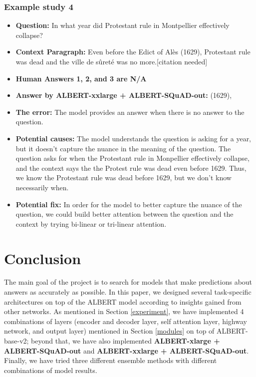 \documentclass{article}
\begin{document}
\subsubsection{Example study 4}
\begin{itemize}
    \item \textbf{Question:} In what year did Protestant rule in Montpellier effectively collapse?
    \item \textbf{Context Paragraph:} Even before the Edict of Alès (1629), Protestant rule was dead and the ville de sûreté was no more.[citation needed]
    \item \textbf{Human Answers 1, 2, and 3 are N/A} 
    \item \textbf{Answer by ALBERT-xxlarge + ALBERT-SQuAD-out:} (1629),
\item \textbf{The error:} The model provides an answer when there is no answer to the question.
    \item \textbf{Potential causes:} The model understands the question is asking for a year, but it doesn't capture the nuance in the meaning of the question. The question asks for when the Protestant rule in Monpellier effectively collapse, and the context says the the Protest rule was dead even before 1629. Thus, we know the Protestant rule was dead before 1629, but we don't know necessarily when.
    \item \textbf{Potential fix:} In order for the model to better capture the nuance of the question, we could build better attention between the question and the context by trying bi-linear or tri-linear attention.
\end{itemize}


\section{Conclusion} \label{conclusion}
The main goal of the project is to search for models that make predictions about answers as accurately as possible. In this paper, we designed several task-specific architectures on top of the ALBERT model according to insights gained from other networks. As mentioned in Section \ref{experiment}, we have implemented 4 combinations of layers (encoder and decoder layer, self attention layer, highway network, and output layer) mentioned in Section \ref{modules} on top of ALBERT-base-v2; beyond that, we have also implemented \textbf{ALBERT-xlarge + ALBERT-SQuAD-out} and \textbf{ALBERT-xxlarge + ALBERT-SQuAD-out}. Finally, we have tried three different ensemble methods with different combinations of model results.
\end{document}
